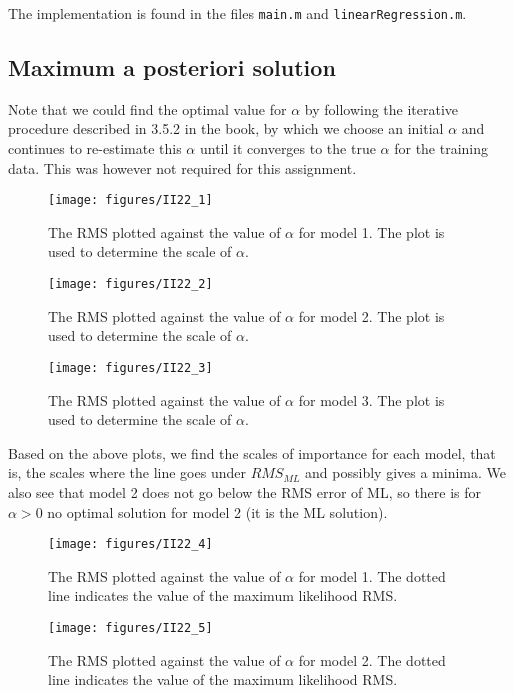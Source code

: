 \documentclass[a4paper, 11pt]{article}
\begin{document}
The implementation is found in the files \texttt{main.m} and \texttt{linearRegression.m}.

\subsection{Maximum a posteriori solution}
Note that we could find the optimal value for $\alpha$ by following the iterative procedure described in 3.5.2 in the book, by which we choose an initial $\alpha$ and continues to re-estimate this $\alpha$ until it converges to the true $\alpha$ for the training data. This was however not required for this assignment.

\begin{figure}[H]
    \centering
    \texttt{[image: figures/II22\_1]}
    \caption{The RMS plotted against the value of $\alpha$ for model 1. The plot is used to determine the scale of $\alpha$.}
    \label{fig:II22_1}
\end{figure}

\begin{figure}[H]
    \centering
    \texttt{[image: figures/II22\_2]}
    \caption{The RMS plotted against the value of $\alpha$ for model 2. The plot is used to determine the scale of $\alpha$.}
    \label{fig:II22_2}
\end{figure}

\begin{figure}[H]
    \centering
    \texttt{[image: figures/II22\_3]}
    \caption{The RMS plotted against the value of $\alpha$ for model 3. The plot is used to determine the scale of $\alpha$.}
    \label{fig:II22_3}
\end{figure}

Based on the above plots, we find the scales of importance for each model, that is, the scales where the line goes under $RMS_{ML}$ and possibly gives a minima. We also see that model 2 does not go below the RMS error of ML, so there is for $\alpha > 0$ no optimal solution for model 2 (it is the ML solution).

\begin{figure}[H]
    \centering
    \texttt{[image: figures/II22\_4]}
    \caption{The RMS plotted against the value of $\alpha$ for model 1. The dotted line indicates the value of the maximum likelihood RMS.}
    \label{fig:II22_4}
\end{figure}

\begin{figure}[H]
    \centering
    \texttt{[image: figures/II22\_5]}
    \caption{The RMS plotted against the value of $\alpha$ for model 2. The dotted line indicates the value of the maximum likelihood RMS.}
    \label{fig:II22_5}
\end{figure}
\end{document}
